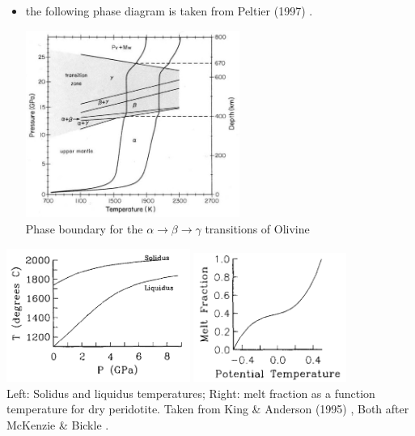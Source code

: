 \begin{itemize}
The obvious problem with this otherwise simple approach is that density varies in the domain but 
is not accompanied by a volume change so that it violates mass conservation.

\item the following phase diagram is taken from Peltier \etal (1997) \cite{pebs97}.

\begin{center}
\includegraphics[width=7cm]{images/phasetransitions/pebs97}\\
{\captionfont Phase boundary for the $\alpha \rightarrow \beta \rightarrow \gamma$ transitions of 
Olivine}
\end{center}


\end{itemize}


\begin{center}
\includegraphics[width=6cm]{images/phasetransitions/kian95a}
\includegraphics[width=5cm]{images/phasetransitions/kian95b}\\
{\captionfont Left: Solidus and liquidus temperatures; 
Right: melt fraction as a function temperature for dry peridotite.
Taken from King \& Anderson (1995) \cite{kian95}, 
Both after McKenzie \& Bickle \cite{mcbi88}.}
\end{center}

